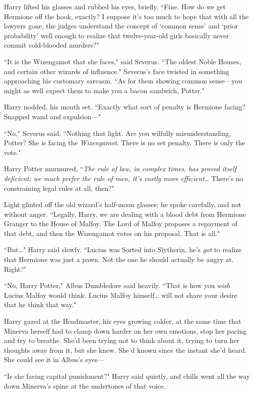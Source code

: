Harry lifted his glasses and rubbed his eyes, briefly. ``Fine. How do we get Hermione off the hook, exactly? I suppose it's too much to hope that with all the lawyers gone, the judges understand the concept of `common sense' and `prior probability' well enough to realize that twelve-year-old girls basically never commit cold-blooded murders?"

``It is the Wizengamot that she faces," said Severus. ``The oldest Noble Houses, and certain other wizards of influence." Severus's face twisted in something approaching his customary sarcasm. ``As for them showing common sense—you might as well expect them to make you a bacon sandwich, Potter."

Harry nodded, his mouth set. ``Exactly what sort of penalty is Hermione facing? Snapped wand and expulsion—"

``No," Severus said. ``Nothing that light. Are you wilfully misunderstanding, Potter? She is facing the \emph{Wizengamot}. There is no set penalty. There is only the vote."

Harry Potter murmured, ``\emph{The rule of law, in complex times, has proved itself deficient; we much prefer the rule of men, it's vastly more efficient{\ldots}} There's no constraining legal rules at all, then?"

Light glinted off the old wizard's half-moon glasses; he spoke carefully, and not without anger. ``Legally, Harry, we are dealing with a blood debt from Hermione Granger to the House of Malfoy. The Lord of Malfoy proposes a repayment of that debt, and then the Wizengamot votes on his proposal. That is all."

``But{\ldots}" Harry said slowly. ``Lucius was Sorted into Slytherin, he's \emph{got} to realize that Hermione was just a pawn. Not the one he should actually be angry at. Right?"

``No, Harry Potter," Albus Dumbledore said heavily. ``That is how you \emph{wish} Lucius Malfoy would think. Lucius Malfoy himself{\ldots} will not share your desire that he think that way."

Harry gazed at the Headmaster, his eyes growing colder, at the same time that Minerva herself had to clamp down harder on her own emotions, stop her pacing and try to breathe. She'd been trying not to think about it, trying to turn her thoughts away from it, but she knew. She'd known since the instant she'd heard. She could see it in Albus's eyes—

``Is she facing capital punishment?" Harry said quietly, and chills went all the way down Minerva's spine at the undertones of that voice.

